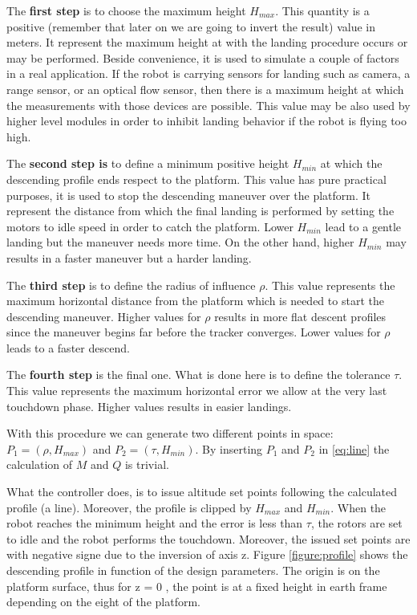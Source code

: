 The \textbf{first step} is to choose the maximum height $H_{max}$. This quantity is a positive (remember that later on we are going to invert the result) value in meters. It represent the maximum height at with the landing procedure occurs or may be performed. Beside convenience, it is used to simulate a couple of factors in a real application. If the robot is carrying sensors for landing such as camera, a range sensor, or an optical flow sensor, then there is a maximum height at which the measurements with those devices are possible. This value may be also used by higher level modules in order to inhibit landing behavior if the robot is flying too high. 

The \textbf{second step is} to define a minimum positive height $H_{min}$ at which the descending profile ends respect to the platform. This value has pure practical purposes, it is used to stop the descending maneuver over the platform. It represent the distance from which the final landing is performed by setting the motors to idle speed in order to catch the platform. Lower $H_{min}$ lead to a gentle landing but the maneuver needs more time. On the other hand, higher $H_{min}$ may results in a faster maneuver but a harder landing.

The \textbf{third step} is to define the radius of influence $\rho$. This value represents the maximum horizontal distance from the platform which is needed to start the descending maneuver.  Higher values for  $\rho$ results in more flat descent profiles since the maneuver begins far before the tracker converges. Lower values for  $\rho$ leads to a faster descend.

The \textbf{fourth step} is the final one. What is done here is to define the tolerance $\tau$. This value represents the maximum horizontal error we allow at the very last touchdown phase. Higher values results in easier landings.

With this procedure we can generate two different points in space: $P_1 = \left(\rho , H_{max}\right)$ and  $P_2 = \left(\tau , H_{min}\right)$. By inserting $P_1$ and $P_2$ in \eqref{eq:line} the calculation of $M$ and $Q$ is trivial.

What the controller does, is to issue altitude set points following the calculated profile (a line). Moreover, the profile is clipped by $H_{max}$ and $H_{min}$. When the robot reaches the minimum height and the error is less than $\tau$, the rotors are set to idle and the robot performs the touchdown. Moreover, the issued set points are with negative signe due to the inversion of axis z.
Figure \ref{figure:profile} shows the descending profile in function of the design parameters. The origin is on the platform surface, thus for z = 0 , the point is at a fixed height in earth frame depending on the eight of the platform.\\

